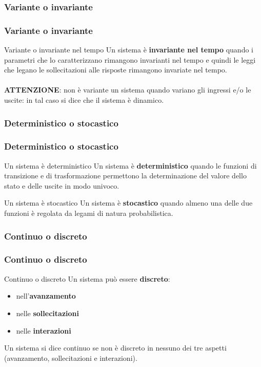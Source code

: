 \subsubsection[Variante o invariante]{Variante o invariante}
\begin{frame}
	\frametitle{Variante o invariante}
	\begin{block}{Variante o invariante nel tempo}
		Un sistema è \textbf{invariante nel tempo} quando i parametri che lo caratterizzano rimangono invarianti nel tempo e quindi le leggi che legano le sollecitazioni alle risposte rimangono invariate nel tempo.\\~\\
		\textbf{ATTENZIONE}: non è variante un sistema quando variano gli ingressi e/o le uscite: in tal caso si dice che il sistema è dinamico.
	\end{block}
\end{frame}


\subsubsection[Deterministico o stocastico]{Deterministico o stocastico}
\begin{frame}
	\frametitle{Deterministico o stocastico}
	\begin{block}{Un sistema è deterministico}
		Un sistema è \textbf{deterministico} quando le funzioni di transizione e di trasformazione permettono la determinazione del valore dello stato e delle uscite in modo univoco.
	\end{block}
	
	\begin{block}{Un sistema è stocastico}
		Un sistema è \textbf{stocastico} quando almeno una delle due funzioni è regolata da legami di natura probabilistica.
	\end{block}
\end{frame}


\subsubsection[Continuo o discreto]{Continuo o discreto}
\begin{frame}
	\frametitle{Continuo o discreto}
	\begin{block}{Continuo o discreto}
		Un sistema può essere \textbf{discreto}:
		\begin{itemize}
			\item nell'\textbf{avanzamento}
			\item nelle \textbf{sollecitazioni}
			\item nelle \textbf{interazioni}
		\end{itemize}
		
		Un sistema si dice continuo se non è discreto in nessuno dei tre aspetti (avanzamento, sollecitazioni e interazioni).
	\end{block}
\end{frame}


